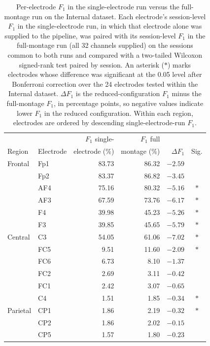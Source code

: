 \documentclass[journal,twoside,web]{ieeecolor}
\begin{document}
\begin{table}[htbp]
  \centering
  \renewcommand{\baselinestretch}{1}\normalsize
  \caption{Per-electrode $F_1$ in the single-electrode run versus the full-montage run on the Internal dataset. Each electrode's session-level $F_1$ in the single-electrode run, in which that electrode alone was supplied to the pipeline, was paired with its session-level $F_1$ in the full-montage run (all 32 channels supplied) on the sessions common to both runs and compared with a two-tailed Wilcoxon signed-rank test paired by session. An asterisk ($*$) marks electrodes whose difference was significant at the 0.05 level after Bonferroni correction over the 24 electrodes tested within the Internal dataset. $\Delta F_1$ is the reduced-configuration $F_1$ minus the full-montage $F_1$, in percentage points, so negative values indicate lower $F_1$ in the reduced configuration. Within each region, electrodes are ordered by descending single-electrode-run $F_1$.}
  \label{tab:app_single_internal}
  \footnotesize
  \setlength{\tabcolsep}{2.5pt}
  \begin{tabular}{@{}llrrrc@{}}
    \toprule
     &  & $F_1$ single- & $F_1$ full &  & \\
    Region & Electrode & electrode (\%) & montage (\%) & $\Delta F_1$ & Sig. \\
    \midrule
    Frontal & Fp1 & 83.73 & 86.32 & $-2.59$ & \\
     & Fp2 & 83.37 & 86.82 & $-3.45$ & \\
     & AF4 & 75.16 & 80.32 & $-5.16$ & $*$ \\
     & AF3 & 67.59 & 73.76 & $-6.17$ & $*$ \\
     & F4 & 39.98 & 45.23 & $-5.26$ & $*$ \\
     & F3 & 39.85 & 45.65 & $-5.79$ & $*$ \\
    \addlinespace
    Central & C3 & 54.05 & 61.06 & $-7.02$ & $*$ \\
     & FC5 & 9.51 & 11.60 & $-2.09$ & $*$ \\
     & FC6 & 6.73 & 8.10 & $-1.37$ & \\
     & FC2 & 2.69 & 3.11 & $-0.42$ & \\
     & FC1 & 2.42 & 3.07 & $-0.65$ & \\
     & C4 & 1.51 & 1.85 & $-0.34$ & $*$ \\
    \addlinespace
    Parietal & CP1 & 1.86 & 2.19 & $-0.32$ & $*$ \\
     & CP2 & 1.86 & 2.02 & $-0.15$ & \\
     & CP5 & 1.57 & 1.80 & $-0.23$ & \\

\end{tabular}
\end{table}
\end{document}
